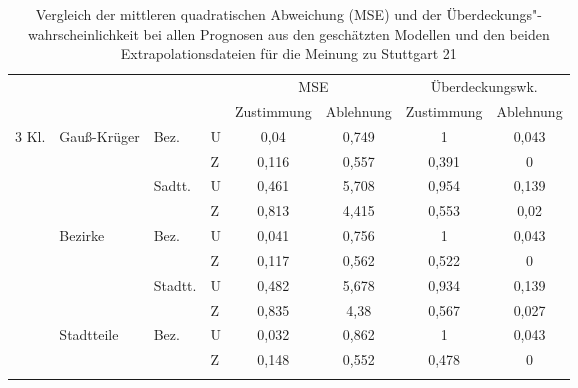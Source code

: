 \documentclass{Vorlage}
\begin{document}
\begin{table}[h]
\centering
\caption{Vergleich der mittleren quadratischen Abweichung (MSE) und der Überdeckungs"-wahrscheinlichkeit bei allen Prognosen aus den geschätzten Modellen und den beiden Extrapolationsdateien für die Meinung zu Stuttgart 21}
\label{vali}
\begin{tabular}{llll|cc|cc}
\hline \hline
                        &                               &                          &   & \multicolumn{2}{c|}{MSE} & \multicolumn{2}{c}{Überdeckungswk.} \\
                        &                               &                          &   & Zustimmung  & Ablehnung  & Zustimmung        & Ablehnung       \\ \hline
\multirow{12}{*}{3 Kl.} & \multirow{4}{*}{Gauß-Krüger} & \multirow{2}{*}{Bez.}    & U & 0,04        & 0,749      & 1                 & 0,043           \\
                        &                               &                          & Z & 0,116       & 0,557      & 0,391             & 0               \\ \cline{3-8} 
                        &                               & \multirow{2}{*}{Sadtt.}  & U & 0,461       & 5,708      & 0,954             & 0,139           \\
                        &                               &                          & Z & 0,813       & 4,415      & 0,553             & 0,02            \\ \cline{2-8} 
                        & \multirow{4}{*}{Bezirke}      & \multirow{2}{*}{Bez.}    & U & 0,041       & 0,756      & 1                 & 0,043           \\
                        &                               &                          & Z & 0,117       & 0,562      & 0,522             & 0               \\ \cline{3-8} 
                        &                               & \multirow{2}{*}{Stadtt.} & U & 0,482       & 5,678      & 0,934             & 0,139           \\
                        &                               &                          & Z & 0,835       & 4,38       & 0,567             & 0,027           \\ \cline{2-8} 
                        & \multirow{4}{*}{Stadtteile}   & \multirow{2}{*}{Bez.}    & U & 0,032      & 0,862     &      1             &   0,043          \\
                        &                               &                          & Z & 0,148       & 0,552      &     0,478         &     0 \\ \cline{3-8} 

\end{tabular}
\end{table}
\end{document}
